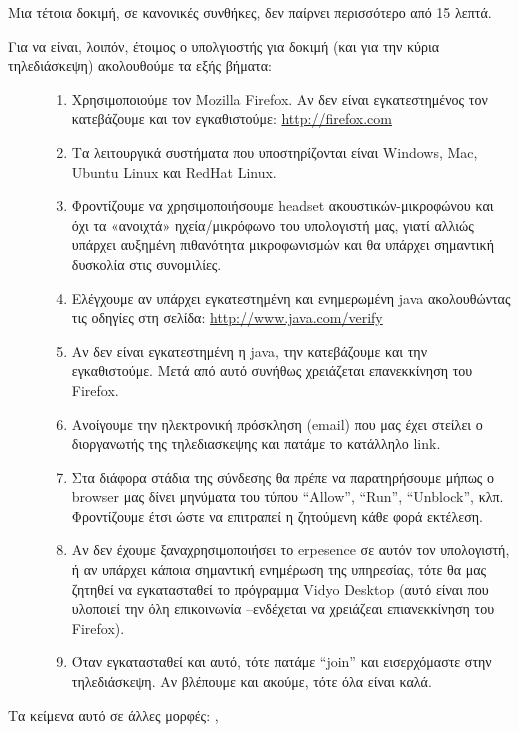 \documentclass[a4paper,11pt,greek]{article}
\begin{document}
Μια τέτοια δοκιμή, σε κανονικές συνθήκες, δεν παίρνει περισσότερο από 15 λεπτά.
\begin{description}
\item[{Για να είναι, λοιπόν, έτοιμος ο υπολγιοστής για δοκιμή (και για την κύρια τηλεδιάσκεψη) ακολουθούμε τα εξής βήματα:}] \leavevmode\begin{enumerate}
\item {} 
Χρησιμοποιούμε τον Mozilla Firefox. Αν δεν είναι εγκατεστημένος τον κατεβάζουμε και τον εγκαθιστούμε: \url{http://firefox.com}

\item {} 
Τα λειτουργικά συστήματα που υποστηρίζονται είναι Windows, Mac, Ubuntu Linux και RedHat Linux.

\item {} 
Φροντίζουμε να χρησιμοποιήσουμε headset ακουστικών-μικροφώνου και όχι τα «ανοιχτά» ηχεία/μικρόφωνο του υπολογιστή μας, γιατί αλλιώς υπάρχει αυξημένη πιθανότητα μικροφωνισμών και θα υπάρχει σημαντική δυσκολία στις συνομιλίες.

\item {} 
Ελέγχουμε αν υπάρχει εγκατεστημένη και ενημερωμένη java ακολουθώντας τις οδηγίες στη σελίδα: \url{http://www.java.com/verify}

\item {} 
Αν δεν είναι εγκατεστημένη η java, την κατεβάζουμε και την εγκαθιστούμε. Μετά από αυτό συνήθως χρειάζεται επανεκκίνηση του Firefox.

\item {} 
Ανοίγουμε την ηλεκτρονική πρόσκληση (email) που μας έχει στείλει ο διοργανωτής της τηλεδιασκεψης και πατάμε το κατάλληλο link.

\item {} 
Στα διάφορα στάδια της σύνδεσης θα πρέπε να παρατηρήσουμε μήπως ο browser μας δίνει μηνύματα του τύπου ``Allow'', ``Run'', ``Unblock'', κλπ. Φροντίζουμε έτσι ώστε να επιτραπεί η ζητούμενη κάθε φορά εκτέλεση.

\item {} 
Αν δεν έχουμε ξαναχρησιμοποιήσει το erpesence σε αυτόν τον υπολογιστή, ή αν υπάρχει κάποια σημαντική ενημέρωση της υπηρεσίας, τότε θα μας ζητηθεί να εγκατασταθεί το πρόγραμμα Vidyo Desktop (αυτό είναι που υλοποιεί την όλη επικοινωνία --ενδέχεται να χρειάζεαι επιανεκκίνηση του Firefox).

\item {} 
Όταν εγκατασταθεί και αυτό, τότε πατάμε ``join'' και εισερχόμαστε στην τηλεδιάσκεψη. Αν βλέπουμε και ακούμε, τότε όλα είναι καλά.

\end{enumerate}

\end{description}

Τα κείμενα αυτό σε άλλες μορφές: \code{{[}epub{]}}, 



\renewcommand{\indexname}{Index}
\printindex
\end{document}
